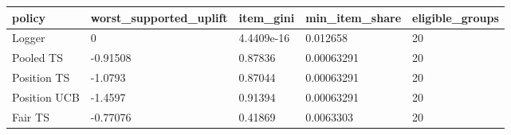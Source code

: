 \begin{tabular}{lllll}
\hline
policy & worst\_supported\_uplift & item\_gini & min\_item\_share & eligible\_groups \\
\hline
Logger & 0 & 4.4409e-16 & 0.012658 & 20 \\
Pooled TS & -0.91508 & 0.87836 & 0.00063291 & 20 \\
Position TS & -1.0793 & 0.87044 & 0.00063291 & 20 \\
Position UCB & -1.4597 & 0.91394 & 0.00063291 & 20 \\
Fair TS & -0.77076 & 0.41869 & 0.0063303 & 20 \\
\hline
\end{tabular}